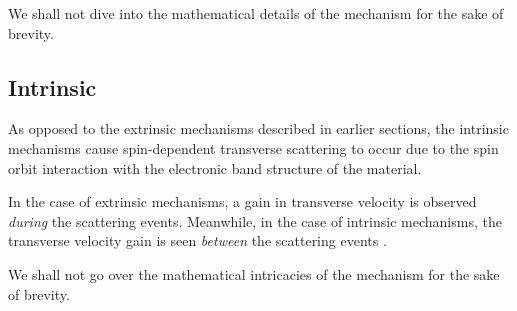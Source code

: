 We shall not dive into the mathematical details of the mechanism for the sake of brevity.


\subsection{Intrinsic}

As opposed to the extrinsic mechanisms described in earlier sections, the intrinsic mechanisms cause spin-dependent transverse scattering to occur due to the spin orbit interaction with the electronic band structure of the material.

In the case of extrinsic mechanisms, a gain in transverse velocity is observed \emph{during} the scattering events.
Meanwhile, in the case of intrinsic mechanisms, the transverse velocity gain is seen \emph{between} the scattering events \cite{hoffmann2013spin}.

We shall not go over the mathematical intricacies of the mechanism for the sake of brevity.
